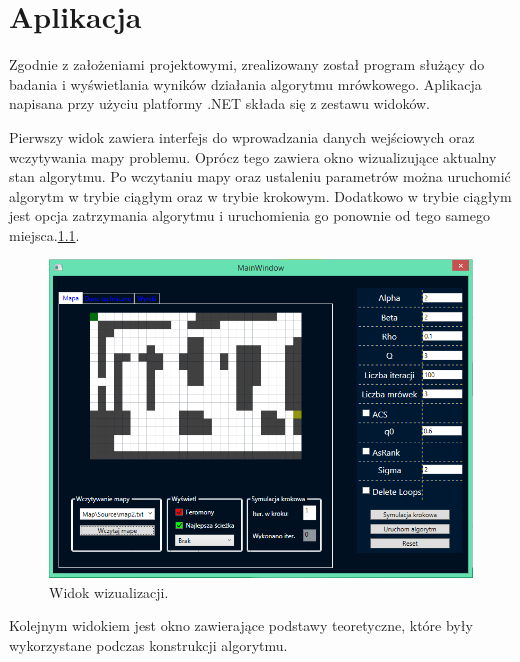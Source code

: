\documentclass[printmode, openany, oneside, eng]{mgr}
\begin{document}
\chapter{Aplikacja} \label{chap:app}

Zgodnie z założeniami projektowymi, zrealizowany został program służący do badania i wyświetlania wyników działania algorytmu mrówkowego. Aplikacja napisana przy użyciu platformy .NET składa się z zestawu widoków. \newline

Pierwszy widok zawiera interfejs do wprowadzania danych wejściowych oraz wczytywania mapy problemu. Oprócz tego zawiera okno wizualizujące aktualny stan algorytmu. Po wczytaniu mapy oraz ustaleniu parametrów można uruchomić algorytm w trybie ciągłym oraz w trybie krokowym. Dodatkowo w trybie ciągłym jest opcja zatrzymania algorytmu i uruchomienia go ponownie od tego samego miejsca.\ref{fig:View1}.\newline

\begin{figure}[h]
\centering
\includegraphics[scale=0.75]{img/View1.png}
\caption{Widok wizualizacji.}
\label{fig:View1}
\end{figure}

Kolejnym widokiem jest okno zawierające podstawy teoretyczne, które były wykorzystane podczas konstrukcji algorytmu.
\end{document}
